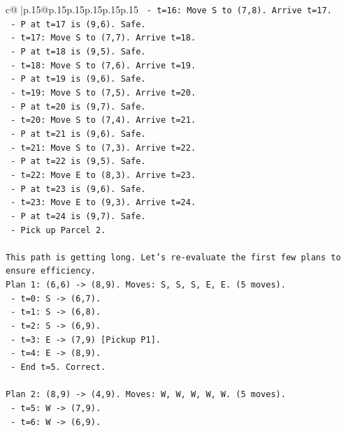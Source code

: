 \documentclass{article}
\begin{document}
{\begin{supertabular}{c@{$\;$}|p{.15\linewidth}@{}p{.15\linewidth}p{.15\linewidth}p{.15\linewidth}p{.15\linewidth}p{.15\linewidth}}
{{{\texttt{  {-} t=16: Move S to (7,8). Arrive t=17.} \\
\texttt{    {-} P at t=17 is (9,6). Safe.} \\
\texttt{  {-} t=17: Move S to (7,7). Arrive t=18.} \\
\texttt{    {-} P at t=18 is (9,5). Safe.} \\
\texttt{  {-} t=18: Move S to (7,6). Arrive t=19.} \\
\texttt{    {-} P at t=19 is (9,6). Safe.} \\
\texttt{  {-} t=19: Move S to (7,5). Arrive t=20.} \\
\texttt{    {-} P at t=20 is (9,7). Safe.} \\
\texttt{  {-} t=20: Move S to (7,4). Arrive t=21.} \\
\texttt{    {-} P at t=21 is (9,6). Safe.} \\
\texttt{  {-} t=21: Move S to (7,3). Arrive t=22.} \\
\texttt{    {-} P at t=22 is (9,5). Safe.} \\
\texttt{  {-} t=22: Move E to (8,3). Arrive t=23.} \\
\texttt{    {-} P at t=23 is (9,6). Safe.} \\
\texttt{  {-} t=23: Move E to (9,3). Arrive t=24.} \\
\texttt{    {-} P at t=24 is (9,7). Safe.} \\
\texttt{    {-} Pick up Parcel 2.} \\
\\ 
\texttt{This path is getting long. Let's re{-}evaluate the first few plans to ensure efficiency.} \\
\texttt{Plan 1: (6,6) {-}> (8,9). Moves: S, S, S, E, E. (5 moves).} \\
\texttt{  {-} t=0: S {-}> (6,7).} \\
\texttt{  {-} t=1: S {-}> (6,8).} \\
\texttt{  {-} t=2: S {-}> (6,9).} \\
\texttt{  {-} t=3: E {-}> (7,9) {[}Pickup P1{]}.} \\
\texttt{  {-} t=4: E {-}> (8,9).} \\
\texttt{  {-} End t=5. Correct.} \\
\\ 
\texttt{Plan 2: (8,9) {-}> (4,9). Moves: W, W, W, W, W. (5 moves).} \\
\texttt{  {-} t=5: W {-}> (7,9).} \\
\texttt{  {-} t=6: W {-}> (6,9).} \\
}}}
\end{supertabular}}
\end{document}
